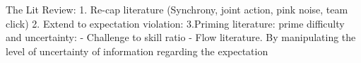 \documentclass[english]{article}\usepackage[]{graphicx}\usepackage[]{color}
\begin{document}
The Lit Review:
1. Re-cap literature (Synchrony, joint action, pink noise, team click)
2. Extend to expectation violation:
3.Priming literature: prime difficulty and uncertainty:
- Challenge to skill ratio - Flow literature.
By manipulating the level of uncertainty of information regarding the expectation



\end{document}
